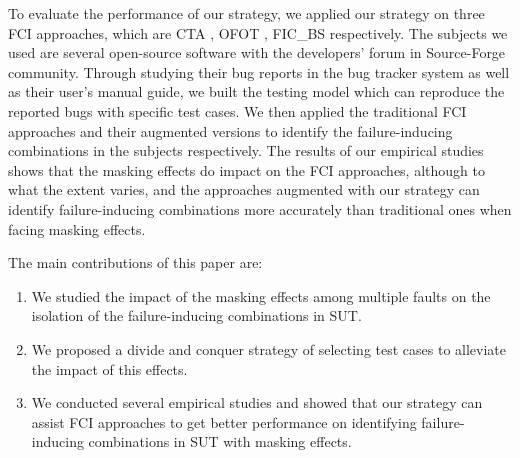 \documentclass{sig-alternate}
\begin{document}


To evaluate the performance of our strategy, we applied our strategy on three FCI approaches, which are CTA \cite{yilmaz2006covering}, OFOT \cite{nie2011minimal}, FIC\_BS \cite{zhang2011characterizing} respectively. The subjects we used are several open-source software with the developers' forum in Source-Forge community. Through studying their bug reports in the bug tracker system as well as their user's manual guide, we built the testing model which can reproduce the reported bugs with specific test cases. We then applied the traditional FCI approaches and their augmented versions to identify the failure-inducing combinations in the subjects respectively. The results of our empirical studies shows that the masking effects do impact on the FCI approaches, although to what the extent varies, and the approaches augmented with our strategy can identify failure-inducing combinations more accurately than traditional ones when facing masking effects.

The main contributions of this paper are:
\begin{enumerate}
 \item We studied the impact of the masking effects among multiple faults on the isolation of the failure-inducing combinations in SUT.
 \item We proposed a divide and conquer strategy of selecting test cases to alleviate the impact of this effects.
 \item We conducted several empirical studies and showed that our strategy can assist FCI approaches to get better performance on identifying failure-inducing combinations in SUT with masking effects.
\end{enumerate}
\end{document}

